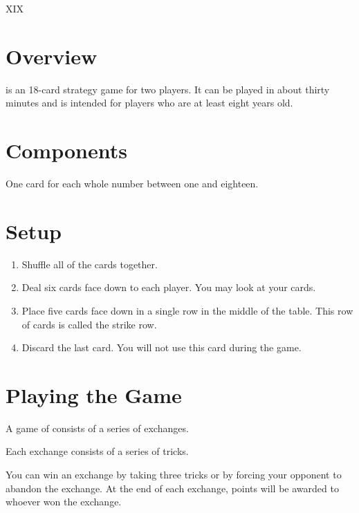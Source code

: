 \documentclass[a6paper, parskip=half, DIV=14, 10pt]{scrartcl}
\newcommand{\textRN}[1]{{\setmainfont{Roboto Slab} \RomanNumeral{#1}}}
\begin{document}
{%
\setmainfont[Scale=5.0]{Roboto Slab}
\Huge
\phantom{a}
\vfill{}
\begin{center}
XIX
\vfill
\phantom{a}
\end{center}
}%
\newpage
\setmainfont{Roboto}%
\raggedright%
\section*{Overview}
\textRN{19} is an 18-card strategy game for two players. It can be played in about thirty minutes and is intended for players who are at least eight years old.

\section*{Components}
\begin{description}[leftmargin=0pt, labelsep=\widthof{\ }]
	\item[Numbered Cards (18) \textendash] One card for each whole number between one and eighteen.
\end{description}

\section*{Setup}
\begin{enumerate}[leftmargin=*]
	\item Shuffle all of the cards together. 
	\item Deal six cards face down to each player. You may look at your cards.
	\item Place five cards face down in a single row in the middle of the table. This row of cards is called the strike row.
	\item Discard the last card. You will not use this card during the game.
\end{enumerate}

\newpage

\section*{Playing the Game}
A game of \textRN{19} consists of a series of exchanges.

Each exchange consists of a series of tricks.

You can win an exchange by taking three tricks or by forcing your opponent to abandon the exchange. At the end of each exchange, points will be awarded to whoever won the exchange.
\end{document}
